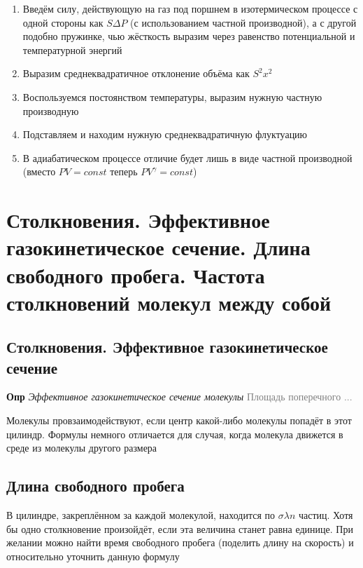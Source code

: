 \documentclass[a4paper, 14pt]{article}
\begin{document}
    \begin{enumerate}
        \item Введём силу, действующую на газ под поршнем в изотермическом процессе с одной стороны как $S \Delta P$
        (с использованием частной производной), а с другой подобно пружинке, чью жёсткость выразим через равенство
        потенциальной и температурной энергий
        \item Выразим среднеквадратичное отклонение объёма как $S^2 x^2$
        \item Воспользуемся постоянством температуры, выразим нужную частную производную
        \item Подставляем и находим нужную среднеквадратичную флуктуацию
        \item В адиабатическом процессе отличие будет лишь в виде частной производной (вместо $PV = const$ теперь $PV^\gamma = const$)
    \end{enumerate}
    
    \section{Столкновения. Эффективное газокинетическое сечение.
    Длина свободного пробега.
    Частота столкновений молекул между собой}
    
    \subsection{Столкновения. Эффективное газокинетическое сечение}
    
    \textbf{Опр} \textit{Эффективное газокинетическое сечение молекулы} \textcolor{gray}{Площадь поперечного ...}
    
    Молекулы провзаимодействуют, если центр какой-либо молекулы попадёт в этот цилиндр.
    Формулы немного отличается для случая, когда молекула движется в среде из молекулы другого размера
    
    \subsection{Длина свободного пробега}
    
    В цилиндре, закреплённом за каждой молекулой, находится по $\sigma \lambda n$ частиц.
    Хотя бы одно столкновение произойдёт, если эта величина станет равна единице.
    При желании можно найти время свободного пробега (поделить длину на скорость) и относительно уточнить данную формулу
    
\end{document}
